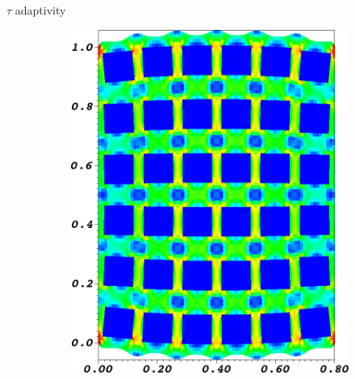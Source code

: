 \documentclass{beamer}
\begin{document}

\begin{frame}{$\tau$ adaptivity}
  \begin{figure}
  \centering
  \begin{subfigure}[b]{0.18\textwidth}
    \includegraphics[width=\textwidth]{figures/MG/ElasticityCompressTrim}
  \end{subfigure} ~
  \begin{subfigure}[b]{0.18\textwidth}

\end{subfigure}
\end{figure}
\end{frame}
\end{document}
